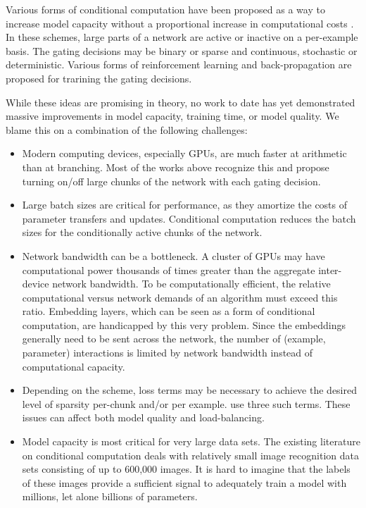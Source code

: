 \documentclass{article} \pdfoutput=1
\begin{document}
Various forms of conditional computation have been proposed as a way to increase model capacity without a proportional increase in computational costs \citep{Davis13:CondComp, Bengio13:CondComp, eigen2013learning, Denoyer14:CondComp,  Cho14, Bengio15:CondComp, Almahairi15}.  In these schemes, large parts of a network are active or inactive on a per-example basis.  The gating decisions may be binary or sparse and continuous, stochastic or deterministic.  Various forms of reinforcement learning and back-propagation are proposed for trarining the gating decisions. 

While these ideas are promising in theory, no work to date has yet demonstrated massive improvements in model capacity, training time, or model quality.  We blame this on a combination of the following challenges:

\begin{itemize}
  \item Modern computing devices, especially GPUs, are much faster at arithmetic than at branching.   Most of the works above recognize this and propose turning on/off large chunks of the network with each gating decision.
  \item Large batch sizes are critical for performance, as they amortize the costs of parameter transfers and updates.  Conditional computation reduces the batch sizes for the conditionally active chunks of the network.
  \item Network bandwidth can be a bottleneck.  A cluster of GPUs may have computational power thousands of times greater than the aggregate inter-device network bandwidth.  To be computationally efficient, the relative computational versus network demands of an algorithm must exceed this ratio.   Embedding layers, which can be seen as a form of conditional computation, are handicapped by this very problem.  Since the embeddings generally need to be sent across the network, the number of (example, parameter) interactions is limited by network bandwidth instead of computational capacity.
  \item Depending on the scheme, loss terms may be necessary to achieve the desired level of sparsity per-chunk and/or per example. \cite{Bengio15:CondComp} use three such terms.  These issues can affect both model quality and load-balancing.
  \item Model capacity is most critical for very large data sets.  The existing literature on conditional computation deals with relatively small image recognition data sets consisting of up to 600,000 images.  It is hard to imagine that the labels of these images provide a sufficient signal to adequately train a model with millions, let alone billions of parameters.
\end{itemize}
 
\end{document}
